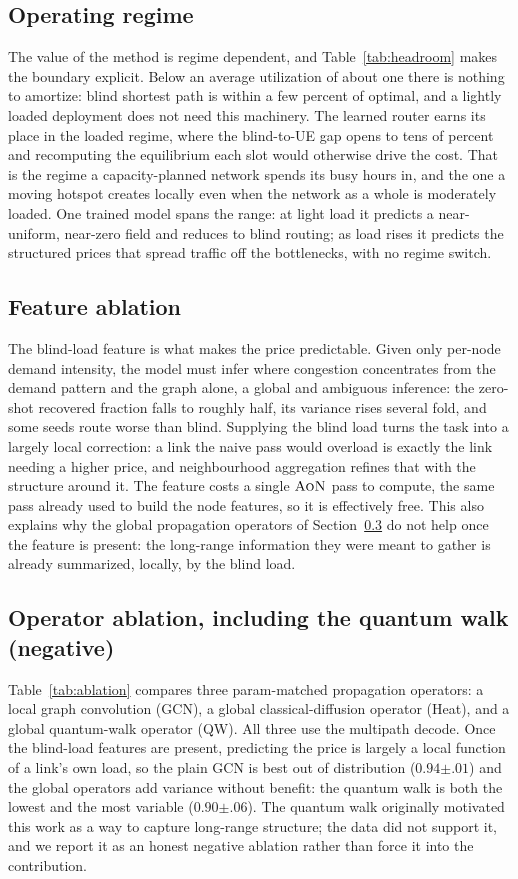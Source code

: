 \documentclass[journal]{IEEEtran}
\newcommand{\AoN}{\textsc{AoN}}
\begin{document}
\subsection{Operating regime}\label{sec:regime}
The value of the method is regime dependent, and Table~\ref{tab:headroom} makes the boundary explicit. Below an average utilization of about one there is nothing to amortize: blind shortest path is within a few percent of optimal, and a lightly loaded deployment does not need this machinery. The learned router earns its place in the loaded regime, where the blind-to-UE gap opens to tens of percent and recomputing the equilibrium each slot would otherwise drive the cost. That is the regime a capacity-planned network spends its busy hours in, and the one a moving hotspot creates locally even when the network as a whole is moderately loaded. One trained model spans the range: at light load it predicts a near-uniform, near-zero field and reduces to blind routing; as load rises it predicts the structured prices that spread traffic off the bottlenecks, with no regime switch.

\subsection{Feature ablation}\label{sec:ablate-feat}
The blind-load feature is what makes the price predictable. Given only per-node demand intensity, the model must infer where congestion concentrates from the demand pattern and the graph alone, a global and ambiguous inference: the zero-shot recovered fraction falls to roughly half, its variance rises several fold, and some seeds route worse than blind. Supplying the blind load turns the task into a largely local correction: a link the naive pass would overload is exactly the link needing a higher price, and neighbourhood aggregation refines that with the structure around it. The feature costs a single $\AoN$ pass to compute, the same pass already used to
build the node features, so it is effectively free. This also explains why the global
propagation operators of Section~\ref{sec:ablation} do not help once the feature is present:
the long-range information they were meant to gather is already summarized, locally, by the
blind load.

\subsection{Operator ablation, including the quantum walk (negative)}\label{sec:ablation}
Table~\ref{tab:ablation} compares three param-matched propagation operators: a local
graph convolution (GCN), a global classical-diffusion operator (Heat), and a global
quantum-walk operator (QW). All three use the multipath decode. Once the blind-load
features are present, predicting the price is largely a local function of a link's own
load, so the plain GCN is best out of distribution ($0.94{\scriptstyle\pm.01}$) and the global operators
add variance without benefit: the quantum walk is both the lowest and the most variable
($0.90{\scriptstyle\pm.06}$). The quantum walk originally motivated this work as a way to capture long-range
structure; the data did not support it, and we report it as an honest negative ablation
rather than force it into the contribution.
\end{document}
